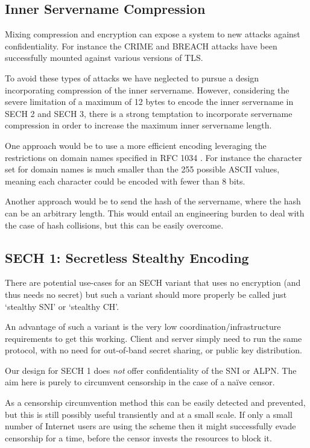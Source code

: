 \subsection{Inner Servername Compression}
Mixing compression and encryption can expose a system
to new attacks against confidentiality.
For instance the \ac{CRIME} and \ac{BREACH} attacks
have been successfully mounted against various versions of \ac{TLS}.

To avoid these types of attacks we have neglected
to pursue a design incorporating compression of the inner servername.
However, considering the severe limitation of a maximum of 12 bytes
to encode the inner servername in \ac{SECH} 2 and \ac{SECH} 3,
there is a strong temptation to incorporate servername compression
in order to increase the maximum inner servername length.

One approach would be to use a more efficient encoding leveraging
the restrictions on domain names specified in RFC 1034 \citep{rfc1034}.
For instance the character set for domain names is much smaller than the 255 possible ASCII values, meaning each character could be encoded with fewer than 8 bits.

Another approach would be to send the hash of the servername,
where the hash can be an arbitrary length.
This would entail an engineering burden to deal with the case
of hash collisions, but this can be easily overcome.

\subsection{SECH 1: Secretless Stealthy Encoding}
\label{sec:sech1}
There are potential use-cases
for an \ac{SECH} variant
that uses no encryption (and thus
needs no secret)
but such a variant should more properly be called just `stealthy SNI' or `stealthy CH'.

An advantage of such a variant is the very low coordination/infrastructure requirements to get this working.
Client and server simply need to run the same
protocol, with no need for out-of-band secret sharing,
or public key distribution.

Our design for \ac{SECH} 1 does {\em not} offer confidentiality of the \ac{SNI} or \ac{ALPN}.
The aim here is purely to circumvent censorship
in the case of a naïve censor.

As a censorship circumvention method this can be easily detected and prevented,
but this is still possibly useful transiently and at a small scale.
If only a small number of Internet users are using the scheme
then it might successfully evade censorship for a time,
before the censor invests the resources to block it.

